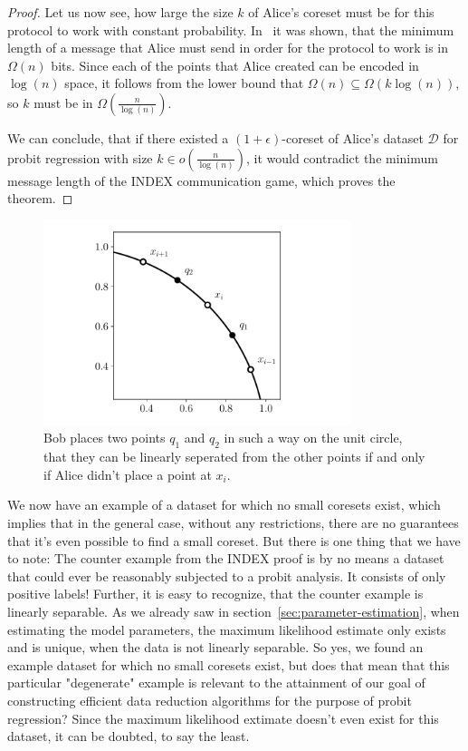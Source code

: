 \begin{proof}
    Let us now see, how large the size $k$ of Alice's coreset must be
    for this protocol to work with constant probability.
    In~\cite{index} it was shown, that the minimum length of a message
    that Alice must send in order for the protocol to work
    is in $\Omega(n)$ bits.
    Since each of the points that Alice created can be encoded in
    $\log(n)$ space, it follows from the lower bound that
    $\Omega(n) \subseteq \Omega(k \log(n))$, so $k$ must be in
    $\Omega\left(\frac{n}{\log(n)}\right)$.

    We can conclude, that if there existed a $(1 + \epsilon)$-coreset
    of Alice's dataset $\mathcal{D}$
    for probit regression with size $k \in o\left(\frac{n}{\log(n)}\right)$,
    it would contradict the minimum message length of
    the INDEX communication game, which proves the theorem.
\end{proof}

\begin{figure}[h]
    \centering
    \includegraphics[width=0.8\textwidth]{figures/index.pdf}
    \caption{Bob places two points $q_1$ and $q_2$ in such a way
        on the unit circle, that they can be linearly seperated from the other
        points if and only if Alice didn't place a point at $x_i$.}
    \label{fig:index}
\end{figure}

We now have an example of a dataset for which no small coresets exist,
which implies that in the general case, without any restrictions,
there are no guarantees that it's even possible to find a small coreset.
But there is one thing that we have to note:
The counter example from the INDEX proof is by no means a
dataset that could ever be reasonably subjected to a probit analysis.
It consists of only positive labels! Further, it is easy to recognize,
that the counter example is linearly separable.
As we already saw in section~\ref{sec:parameter-estimation}, when
estimating the model parameters, the maximum likelihood estimate
only exists and is unique, when the data is not linearly separable.
So yes, we found an example dataset for which no small coresets exist, but
does that mean that this particular "degenerate" example is relevant
to the attainment of our goal of constructing efficient data reduction
algorithms for the purpose of probit regression? Since the
maximum likelihood extimate doesn't even exist for this dataset,
it can be doubted, to say the least.

